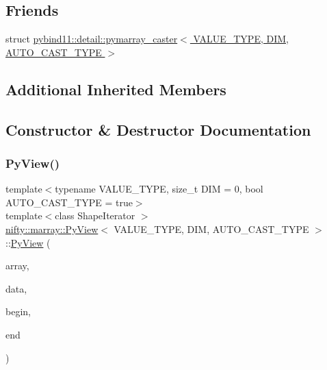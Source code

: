 \subsection*{Friends}
\begin{DoxyCompactItemize}
\item 
struct \hyperlink{classnifty_1_1marray_1_1PyView_a94710a007ad8e0112330a0a68858b22c}{pybind11\+::detail\+::pymarray\+\_\+caster$<$ V\+A\+L\+U\+E\+\_\+\+T\+Y\+P\+E, D\+I\+M, A\+U\+T\+O\+\_\+\+C\+A\+S\+T\+\_\+\+T\+Y\+P\+E $>$}
\end{DoxyCompactItemize}
\subsection*{Additional Inherited Members}


\subsection{Constructor \& Destructor Documentation}
\mbox{\label{classnifty_1_1marray_1_1PyView_a1c3e1533712d9197ebcdbfded78532e8}} 
\subsubsection{\texorpdfstring{Py\+View()}{PyView()}\hspace{0.1cm}{\footnotesize\ttfamily [1/4]}}
{\footnotesize\ttfamily template$<$typename V\+A\+L\+U\+E\+\_\+\+T\+Y\+PE, size\+\_\+t D\+IM = 0, bool A\+U\+T\+O\+\_\+\+C\+A\+S\+T\+\_\+\+T\+Y\+PE = true$>$ \\
template$<$class Shape\+Iterator $>$ \\
\hyperlink{classnifty_1_1marray_1_1PyView}{nifty\+::marray\+::\+Py\+View}$<$ V\+A\+L\+U\+E\+\_\+\+T\+Y\+PE, D\+IM, A\+U\+T\+O\+\_\+\+C\+A\+S\+T\+\_\+\+T\+Y\+PE $>$\+::\hyperlink{classnifty_1_1marray_1_1PyView}{Py\+View} (\begin{DoxyParamCaption}\item[{pybind11\+::array\+\_\+t$<$ V\+A\+L\+U\+E\+\_\+\+T\+Y\+PE $>$}]{array,  }\item[{V\+A\+L\+U\+E\+\_\+\+T\+Y\+PE $\ast$}]{data,  }\item[{Shape\+Iterator}]{begin,  }\item[{Shape\+Iterator}]{end }\end{DoxyParamCaption})\hspace{0.3cm}{\ttfamily [inline]}}

